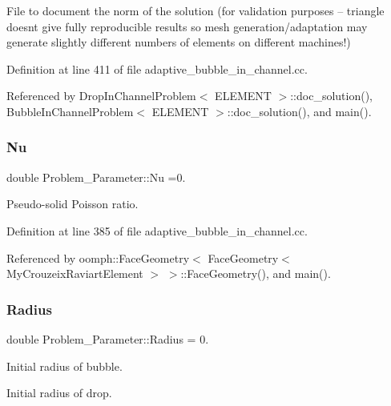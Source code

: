 File to document the norm of the solution (for validation purposes -- triangle doesn\textquotesingle{}t give fully reproducible results so mesh generation/adaptation may generate slightly different numbers of elements on different machines!) 



Definition at line 411 of file adaptive\+\_\+bubble\+\_\+in\+\_\+channel.\+cc.



Referenced by Drop\+In\+Channel\+Problem$<$ E\+L\+E\+M\+E\+N\+T $>$\+::doc\+\_\+solution(), Bubble\+In\+Channel\+Problem$<$ E\+L\+E\+M\+E\+N\+T $>$\+::doc\+\_\+solution(), and main().

\mbox{\label{namespaceProblem__Parameter_abec2e733c8f2d3c18ebc702b3f80cc17}} 
\subsubsection{\texorpdfstring{Nu}{Nu}}
{\footnotesize\ttfamily double Problem\+\_\+\+Parameter\+::\+Nu =0.}



Pseudo-\/solid Poisson ratio. 



Definition at line 385 of file adaptive\+\_\+bubble\+\_\+in\+\_\+channel.\+cc.



Referenced by oomph\+::\+Face\+Geometry$<$ Face\+Geometry$<$ My\+Crouzeix\+Raviart\+Element $>$ $>$\+::\+Face\+Geometry(), and main().

\mbox{\label{namespaceProblem__Parameter_a903237528f0e9bb92debcc8842576cca}} 
\subsubsection{\texorpdfstring{Radius}{Radius}}
{\footnotesize\ttfamily double Problem\+\_\+\+Parameter\+::\+Radius = 0.}



Initial radius of bubble. 

Initial radius of drop. 

